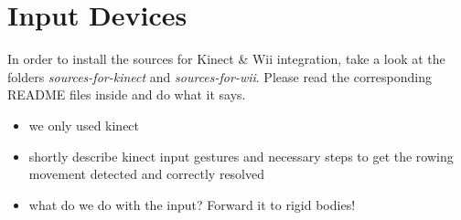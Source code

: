 \section{Input Devices}
In order to install the sources for Kinect \& Wii integration, take a look at the folders \emph{sources-for-kinect} and \emph{sources-for-wii}. Please read the corresponding README files inside and do what it says.

\begin{itemize}
\item we only used kinect
\item shortly describe kinect input gestures and necessary steps to get the rowing movement detected and correctly resolved
\item what do we do with the input? Forward it to rigid bodies!
\end{itemize}
